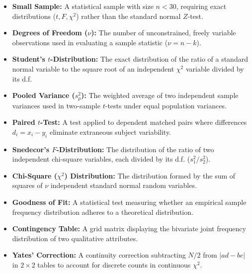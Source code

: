 \documentclass[12pt,a4paper]{article}
\begin{document}
\begin{tcolorbox}[defbox, title={\textbf{One-Line Definitions}}]
\small
\begin{itemize}[leftmargin=11pt, itemsep=2pt, topsep=0pt]
  \item \textbf{Small Sample:} A statistical sample with size $n < 30$, requiring exact distributions ($t, F, \chi^2$) rather than the standard normal $Z$-test.
  \item \textbf{Degrees of Freedom ($\nu$):} The number of unconstrained, freely variable observations used in evaluating a sample statistic ($\nu = n - k$).
  \item \textbf{Student's $t$-Distribution:} The exact distribution of the ratio of a standard normal variable to the square root of an independent $\chi^2$ variable divided by its d.f.
  \item \textbf{Pooled Variance ($s_p^2$):} The weighted average of two independent sample variances used in two-sample $t$-tests under equal population variances.
  \item \textbf{Paired $t$-Test:} A test applied to dependent matched pairs where differences $d_i = x_i - y_i$ eliminate extraneous subject variability.
  \item \textbf{Snedecor's $F$-Distribution:} The distribution of the ratio of two independent chi-square variables, each divided by its d.f. ($s_1^2 / s_2^2$).
  \item \textbf{Chi-Square ($\chi^2$) Distribution:} The distribution formed by the sum of squares of $\nu$ independent standard normal random variables.
  \item \textbf{Goodness of Fit:} A statistical test measuring whether an empirical sample frequency distribution adheres to a theoretical distribution.
  \item \textbf{Contingency Table:} A grid matrix displaying the bivariate joint frequency distribution of two qualitative attributes.
  \item \textbf{Yates' Correction:} A continuity correction subtracting $N/2$ from $|ad - bc|$ in $2 \times 2$ tables to account for discrete counts in continuous $\chi^2$.
\end{itemize}
\end{tcolorbox}
\end{document}
